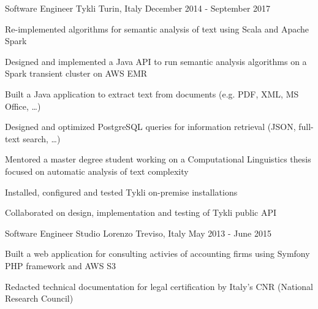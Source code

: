 \begin{cventries}
  \cventry
    {Software Engineer} %
    {Tykli} %
    {Turin, Italy} %
    {December 2014 - September 2017} %
    {
      \begin{cvitems} %
        \item {Re-implemented algorithms for semantic analysis of text using Scala and Apache Spark}
        \item {Designed and implemented a Java API to run semantic analysis algorithms on a Spark transient cluster on AWS EMR}
        \item {Built a Java application to extract text from documents (e.g. PDF, XML, MS Office, \ldots)}
        \item {Designed and optimized PostgreSQL queries for information retrieval (JSON, full-text search, \ldots)}
        \item {Mentored a master degree student working on a Computational Linguistics thesis focused on automatic analysis of text complexity}
        \item {Installed, configured and tested Tykli on-premise installations}
        \item {Collaborated on design, implementation and testing of Tykli public API}
      \end{cvitems}
    }

  \cventry
    {Software Engineer} %
    {Studio Lorenzo} %
    {Treviso, Italy} %
    {May 2013 - June 2015} %
    {
      \begin{cvitems} %
        \item {Built a web application for consulting activies of accounting firms using Symfony PHP framework and AWS S3}
        \item {Redacted technical documentation for legal certification by Italy's CNR (National Research Council)}
      \end{cvitems}
    }

\end{cventries}
